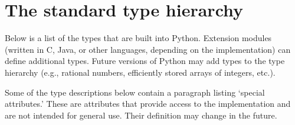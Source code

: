 \section{The standard type hierarchy\label{types}}

Below is a list of the types that are built into Python.  Extension
modules (written in C, Java, or other languages, depending on
the implementation) can define additional types.  Future versions of
Python may add types to the type hierarchy (e.g., rational
numbers, efficiently stored arrays of integers, etc.).

Some of the type descriptions below contain a paragraph listing
`special attributes.'  These are attributes that provide access to the
implementation and are not intended for general use.  Their definition
may change in the future.

